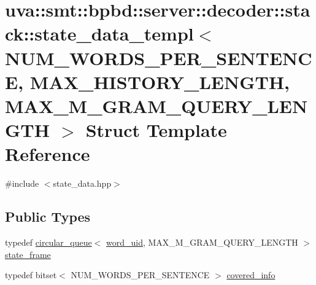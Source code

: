 \hypertarget{structuva_1_1smt_1_1bpbd_1_1server_1_1decoder_1_1stack_1_1state__data__templ}{}\section{uva\+:\+:smt\+:\+:bpbd\+:\+:server\+:\+:decoder\+:\+:stack\+:\+:state\+\_\+data\+\_\+templ$<$ N\+U\+M\+\_\+\+W\+O\+R\+D\+S\+\_\+\+P\+E\+R\+\_\+\+S\+E\+N\+T\+E\+N\+C\+E, M\+A\+X\+\_\+\+H\+I\+S\+T\+O\+R\+Y\+\_\+\+L\+E\+N\+G\+T\+H, M\+A\+X\+\_\+\+M\+\_\+\+G\+R\+A\+M\+\_\+\+Q\+U\+E\+R\+Y\+\_\+\+L\+E\+N\+G\+T\+H $>$ Struct Template Reference}
\label{structuva_1_1smt_1_1bpbd_1_1server_1_1decoder_1_1stack_1_1state__data__templ}


{\ttfamily \#include $<$state\+\_\+data.\+hpp$>$}

\subsection*{Public Types}
\begin{DoxyCompactItemize}
\item 
typedef \hyperlink{classuva_1_1utils_1_1containers_1_1circular__queue}{circular\+\_\+queue}$<$ \hyperlink{namespaceuva_1_1smt_1_1bpbd_1_1server_a6bfe45ba344d65a7fdd7d26156328ddc}{word\+\_\+uid}, M\+A\+X\+\_\+\+M\+\_\+\+G\+R\+A\+M\+\_\+\+Q\+U\+E\+R\+Y\+\_\+\+L\+E\+N\+G\+T\+H $>$ \hyperlink{structuva_1_1smt_1_1bpbd_1_1server_1_1decoder_1_1stack_1_1state__data__templ_a2c9ed737e7c43cdf19eda95e25db2a0d}{state\+\_\+frame}
\item 
typedef bitset$<$ N\+U\+M\+\_\+\+W\+O\+R\+D\+S\+\_\+\+P\+E\+R\+\_\+\+S\+E\+N\+T\+E\+N\+C\+E $>$ \hyperlink{structuva_1_1smt_1_1bpbd_1_1server_1_1decoder_1_1stack_1_1state__data__templ_a1fca0516a4ceb05fe35ea64a0b354d8a}{covered\+\_\+info}
\end{DoxyCompactItemize}
